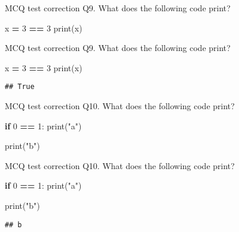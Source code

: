 \documentclass[
  8pt,
  ignorenonframetext,
]{beamer}
\newenvironment{Shaded}{\begin{snugshade}}{\end{snugshade}}
\newcommand{\BuiltInTok}[1]{#1}
\newcommand{\ControlFlowTok}[1]{\textcolor[rgb]{0.13,0.29,0.53}{\textbf{#1}}}
\newcommand{\DecValTok}[1]{\textcolor[rgb]{0.00,0.00,0.81}{#1}}
\newcommand{\NormalTok}[1]{#1}
\newcommand{\OperatorTok}[1]{\textcolor[rgb]{0.81,0.36,0.00}{\textbf{#1}}}
\newcommand{\StringTok}[1]{\textcolor[rgb]{0.31,0.60,0.02}{#1}}
\begin{document}
\begin{frame}[fragile]{MCQ test correction}
\protect\hypertarget{mcq-test-correction-16}{}
Q9. What does the following code print?

\begin{Shaded}
\begin{Highlighting}[]
\NormalTok{x }\OperatorTok{=} \DecValTok{3} \OperatorTok{==} \DecValTok{3}
\BuiltInTok{print}\NormalTok{(x)}
\end{Highlighting}
\end{Shaded}
\end{frame}

\begin{frame}[fragile]{MCQ test correction}
\protect\hypertarget{mcq-test-correction-17}{}
Q9. What does the following code print?

\begin{Shaded}
\begin{Highlighting}[]
\NormalTok{x }\OperatorTok{=} \DecValTok{3} \OperatorTok{==} \DecValTok{3}
\BuiltInTok{print}\NormalTok{(x)}
\end{Highlighting}
\end{Shaded}

\begin{verbatim}
## True
\end{verbatim}
\end{frame}

\begin{frame}[fragile]{MCQ test correction}
\protect\hypertarget{mcq-test-correction-18}{}
Q10. What does the following code print?

\begin{Shaded}
\begin{Highlighting}[]
\ControlFlowTok{if} \DecValTok{0} \OperatorTok{==} \DecValTok{1}\NormalTok{:}
   \BuiltInTok{print}\NormalTok{(}\StringTok{"a"}\NormalTok{)}

\BuiltInTok{print}\NormalTok{(}\StringTok{"b"}\NormalTok{) }
\end{Highlighting}
\end{Shaded}
\end{frame}

\begin{frame}[fragile]{MCQ test correction}
\protect\hypertarget{mcq-test-correction-19}{}
Q10. What does the following code print?

\begin{Shaded}
\begin{Highlighting}[]
\ControlFlowTok{if} \DecValTok{0} \OperatorTok{==} \DecValTok{1}\NormalTok{:}
   \BuiltInTok{print}\NormalTok{(}\StringTok{"a"}\NormalTok{)}

\BuiltInTok{print}\NormalTok{(}\StringTok{"b"}\NormalTok{) }
\end{Highlighting}
\end{Shaded}

\begin{verbatim}
## b
\end{verbatim}
\end{frame}
\end{document}
